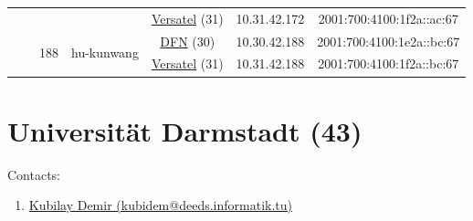 \begin{small}
\begin{center}
\begin{longtable}{|c|c|c|c|c|c|c|c|}
  &  &  &  & \multicolumn{2}{|c|}{\tiny{\href{http://www.versatel.de}{Versatel} (31)}} & \tiny{10.31.42.172} & \tiny{2001:700:4100:1f2a::ac:67} \\* \cline{3-3}\cline{4-4}\cline{5-5}\cline{6-6}\cline{7-7}\cline{8-8}
  &  & \multirow{2}{*}{\tiny{188}} & \multicolumn{1}{|l|}{\multirow{2}{*}{\tiny{hu-kunwang}}} & \multicolumn{2}{|c|}{\tiny{\href{https://www.dfn.de}{DFN} (30)}} & \tiny{10.30.42.188} & \tiny{2001:700:4100:1e2a::bc:67} \\* \cline{5-5}\cline{6-6}\cline{7-7}\cline{8-8}
  &  &  &  & \multicolumn{2}{|c|}{\tiny{\href{http://www.versatel.de}{Versatel} (31)}} & \tiny{10.31.42.188} & \tiny{2001:700:4100:1f2a::bc:67} \\ \hline
\end{longtable}
\end{center}
\end{small}



\section{Universität Darmstadt (43)}
\label{sec:TUDA}

Contacts:\begin{enumerate}
 \item {}\href{mailto:kubidem@deeds.informatik.tu}{Kubilay Demir (kubidem@deeds.informatik.tu)}
\end{enumerate}

